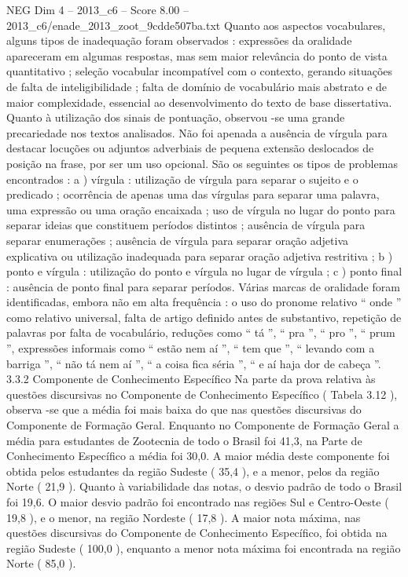 \begin{textsample}{NEG Dim 4 – 2013\_c6 – Score 8.00 – 2013\_c6/enade\_2013\_zoot\_9cdde507ba.txt}
Quanto aos aspectos vocabulares, alguns tipos de inadequação foram observados : expressões da oralidade apareceram em algumas respostas, mas sem maior relevância do ponto de vista quantitativo ; seleção vocabular incompatível com o contexto, gerando situações de falta de inteligibilidade ; falta de domínio de vocabulário mais abstrato e de maior complexidade, essencial ao desenvolvimento do texto de base dissertativa.
Quanto à utilização dos sinais de pontuação, observou -se uma grande precariedade nos textos analisados.
Não foi apenada a ausência de vírgula para destacar locuções ou adjuntos adverbiais de pequena extensão deslocados de posição na frase, por ser um uso opcional.
São os seguintes os tipos de problemas encontrados : a ) vírgula : utilização de vírgula para separar o sujeito e o predicado ; ocorrência de apenas uma das vírgulas para separar uma palavra, uma expressão ou uma oração encaixada ; uso de vírgula no lugar do ponto para separar ideias que constituem períodos distintos ; ausência de vírgula para separar enumerações ; ausência de vírgula para separar oração adjetiva explicativa ou utilização inadequada para separar oração adjetiva restritiva ; b ) ponto e vírgula : utilização do ponto e vírgula no lugar de vírgula ; c ) ponto final : ausência de ponto final para separar períodos.
Várias marcas de oralidade foram identificadas, embora não em alta frequência : o uso do pronome relativo “ onde ” como relativo universal, falta de artigo definido antes de substantivo, repetição de palavras por falta de vocabulário, reduções como “ tá ”, “ pra ”, “ pro ”, “ prum ”, expressões informais como “ estão nem aí ”, “ tem que ”, “ levando com a barriga ”, “ não tá nem aí ”, “ a coisa fica séria ”, “ e aí haja dor de cabeça ”. 3.3.2 Componente de Conhecimento Específico Na parte da prova relativa às questões discursivas no Componente de Conhecimento Específico ( Tabela 3.12 ), observa -se que a média foi mais baixa do que nas questões discursivas do Componente de Formação Geral.
Enquanto no Componente de Formação Geral a média para estudantes de Zootecnia de todo o Brasil foi 41,3, na Parte de Conhecimento Específico a média foi 30,0.
A maior média deste componente foi obtida pelos estudantes da região Sudeste ( 35,4 ), e a menor, pelos da região Norte ( 21,9 ).
Quanto à variabilidade das notas, o desvio padrão de todo o Brasil foi 19,6.
O maior desvio padrão foi encontrado nas regiões Sul e Centro-Oeste ( 19,8 ), e o menor, na região Nordeste ( 17,8 ).
A maior nota máxima, nas questões discursivas do Componente de Conhecimento Específico, foi obtida na região Sudeste ( 100,0 ), enquanto a menor nota máxima foi encontrada na região Norte ( 85,0 ).

\end{textsample}
